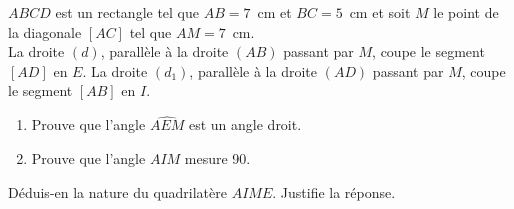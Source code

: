 $ABCD$ est un rectangle tel que $AB=7$~cm et $BC=5$~cm et soit $M$
le point de la diagonale $[AC]$ tel que $AM=7$~cm.\\La droite $(d)$,
parallèle à la droite $(AB)$ passant par $M$, coupe le segment $[AD]$
en $E$. La droite $(d_1)$, parallèle à la droite $(AD)$ passant par
$M$, coupe le segment $[AB]$ en $I$.
\begin{myenumerate}
\item
\begin{enumerate}
\item Prouve que l'angle $\widehat{AEM}$ est un angle droit.
\item Prouve que l'angle $\widehat{AIM}$ mesure 90\degres.
\end{enumerate}
\item Déduis-en la nature du quadrilatère $AIME$. Justifie la réponse.
\end{myenumerate}